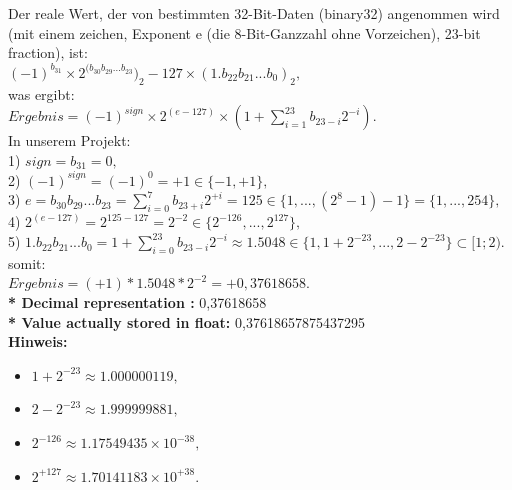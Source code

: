 \documentclass[a4paper]{report}
\begin{document}
Der reale Wert, der von bestimmten 32-Bit-Daten (binary32) angenommen wird (mit einem zeichen, Exponent e (die 8-Bit-Ganzzahl ohne Vorzeichen),  23-bit fraction), ist:\\

$(-1)^{b_{31}}  \times  2^{(b_{30} b_{29} ... b_{23}})_{2} - 127  \times   (1.b_{22} b_{21} ... b_{0})_{2} ,$\\

was ergibt:\\


$ Ergebnis = (-1)^{sign}  \times  2^{(e-127)}  \times  (1 +  \sum_{i=1}^{23} b_{23-i}2^{-i}) . $\\

In unserem Projekt:\\

1)   $sign = b_{31} = 0,$\\

2)   $(-1)^{sign} = (-1)^{0} = +1 \in \{ -1, +1\} ,$\\

3)   $ e = b_{30} b_{29} ... b_{23} = \sum_{i=0}^{7} b_{23+i}2^{+i} = 125 \in \{ 1, ... ,(2^{8}-1)-1\} = \{1,...,254 \} , $\\

4)   $2^{(e-127)} = 2^{125-127} = 2^{-2} \in \{ 2^{-126}, ... , 2^{127}\} , $\\

5)   $1.b_{22}b_{21} ... b_{0} = 1 + \sum_{i=0}^{23} b_{23-i}2^{-i} \approx  1.5048 \in \{ 1,1+2^{-23}, ... ,2 - 2^{-23}\} \subset [1;2).$\\

somit:\\

$Ergebnis = (+1) * 1.5048 * 2^{-2} = +0,37618658. $\\

\textbf{* Decimal representation :} 0,37618658\\

\textbf{* Value actually stored in float:} 0,37618657875437295\\


\textbf{Hinweis:}
	\begin{itemize}
		\item $1 + 2^{-23} \approx 1.000 000 119 ,$
		\item $2 - 2^{-23} \approx 1.999 999 881 ,$
		\item $2^{-126} \approx 1.175 494 35 \times 10^{-38} ,$
		\item $2^{+127} \approx 1.701 411 83 \times 10^{+38} .$
	\end{itemize}
\end{document}

